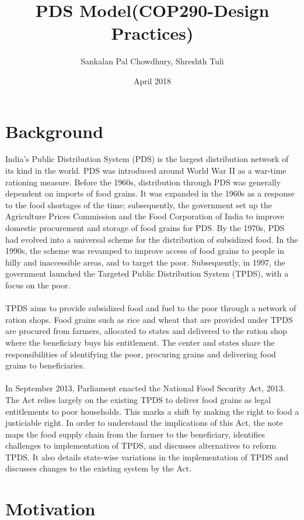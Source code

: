 \documentclass{article}
\title{PDS Model(COP290-Design Practices)}
\author{Sankalan Pal Chowdhury, Shreshth Tuli }
\date{April 2018}
\begin{document}
\maketitle

\section{Background}
India's Public Distribution System (PDS) is the largest distribution network of its kind in the world.  PDS was introduced around World War II as a war-time rationing measure.  Before the 1960s, distribution through PDS was generally dependent on imports of food grains.  It was expanded in the 1960s as a response to the food shortages of the time; subsequently, the government set up the Agriculture Prices Commission and the Food Corporation of India  to improve domestic procurement and storage of food grains for PDS.  By the 1970s, PDS had evolved into a universal scheme for the distribution of subsidized food.  In the 1990s, the scheme was revamped to improve access of food grains to people in hilly and inaccessible areas, and to target the poor.   Subsequently, in 1997, the government launched the Targeted Public Distribution System (TPDS), with a focus on the poor. \\ \\ TPDS aims to provide subsidized food and fuel to the poor through a network of ration shops.  Food grains such as rice and wheat that are provided under TPDS are procured from farmers, allocated to states and delivered to the ration shop where the beneficiary buys his entitlement.  The center and states share the responsibilities of identifying the poor, procuring grains and delivering food grains to beneficiaries. \\ \\ In September 2013, Parliament enacted the National Food Security Act, 2013.  The Act relies largely on the existing TPDS to deliver food grains as legal entitlements to poor households.  This marks a shift by making the right to food a justiciable right.  In order to understand the implications of this Act, the note maps the food supply chain from the farmer to the beneficiary, identifies challenges to implementation of TPDS, and discusses alternatives to reform TPDS.  It also details state-wise variations in the implementation of TPDS and discusses changes to the existing system by the Act. 

\section{Motivation}
\end{document}
